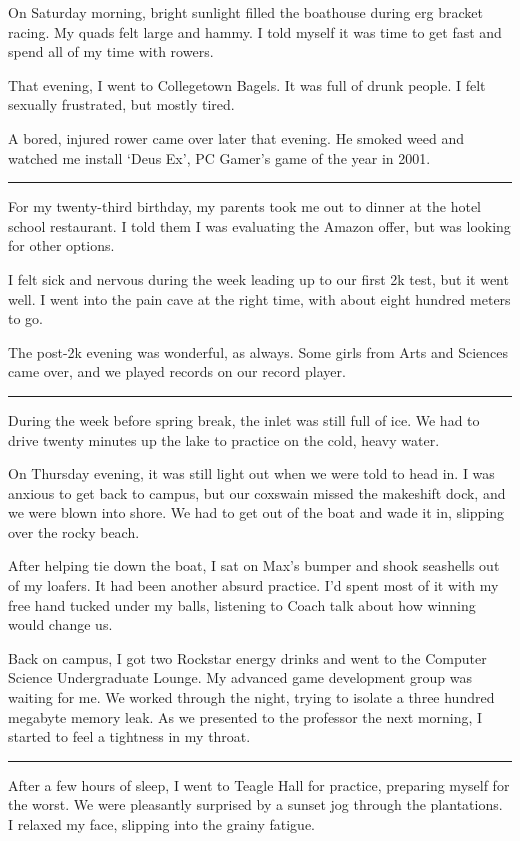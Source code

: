 On Saturday morning, bright sunlight filled the boathouse during erg bracket
racing.  My quads felt large and hammy.  I told myself it was time to get fast
and spend all of my time with rowers.

That evening, I went to Collegetown Bagels.  It was full of drunk people.  I
felt sexually frustrated, but mostly tired.  

A bored, injured rower came over later that evening.  He smoked weed and watched
me install `Deus Ex', PC Gamer's game of the year in 2001. 

\plainfancybreak{12pt}{2}{}

For my twenty-third birthday, my parents took me out to dinner at the hotel
school restaurant.  I told them I was evaluating the Amazon offer, but was
looking for other options.

I felt sick and nervous during the week leading up to our first 2k test, but it
went well.  I went into the pain cave at the right time, with about eight
hundred meters to go.  

The post-2k evening was wonderful, as always.  Some girls from Arts and Sciences
came over, and we played records on our record player.  

\plainfancybreak{12pt}{2}{}

During the week before spring break, the inlet was still full of ice.  We had to
drive twenty minutes up the lake to practice on the cold, heavy water. 

On Thursday evening, it was still light out when we were told to head in.  I was
anxious to get back to campus, but our coxswain missed the makeshift dock, and
we were blown into shore.  We had to get out of the boat and wade it in,
slipping over the rocky beach.

After helping tie down the boat, I sat on Max's bumper and shook seashells out
of my loafers.  It had been another absurd practice.  I'd spent most of it with
my free hand tucked under my balls, listening to Coach talk about how winning
would change us.  

Back on campus, I got two Rockstar energy drinks and went to the Computer
Science Undergraduate Lounge.  My advanced game development group was waiting
for me.  We worked through the night, trying to isolate a three hundred megabyte
memory leak.  As we presented to the professor the next morning, I started to
feel a tightness in my throat.

\plainfancybreak{12pt}{2}{}

After a few hours of sleep, I went to Teagle Hall for practice, preparing myself
for the worst.  We were pleasantly surprised by a sunset jog through the
plantations.  I relaxed my face, slipping into the grainy fatigue.

